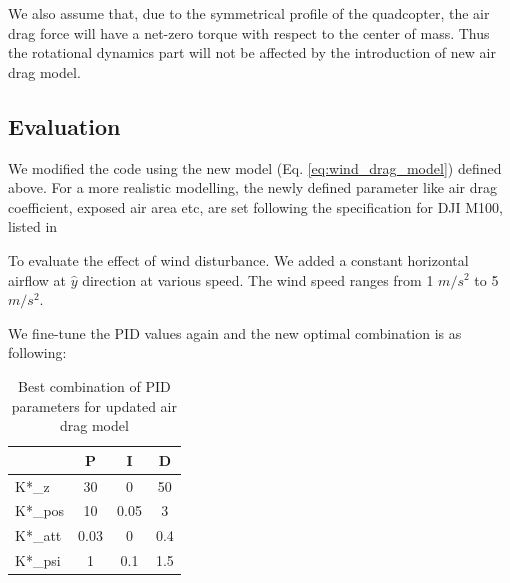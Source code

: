 \documentclass[12pt]{article}
\begin{document}
We also assume that, due to the symmetrical profile of the quadcopter, the air drag force will have a net-zero torque with respect to the center of mass.
Thus the rotational dynamics part will not be affected by the introduction of new air drag model.

\subsection{Evaluation}

We modified the code using the new model (Eq. \ref{eq:wind_drag_model}) defined above.
For a more realistic modelling, the newly defined parameter like air drag coefficient, exposed air area etc, are set following the specification for DJI M100, listed in \cite{liuswanto_modelling_2021}



To evaluate the effect of wind disturbance. We added a constant horizontal airflow at $\hat{y}$ direction at various speed.
The wind speed ranges from 1 $m/s^2$ to 5 $m/s^2$.

We fine-tune the PID values again and the new optimal combination is as following:

\begin{table}[H]
    \centering
    \begin{tabular}{|l|c|c|c|}
        \hline
                & P    & I    & D   \\
        \hline
        K*\_z   & 30   & 0    & 50  \\
        K*\_pos & 10   & 0.05 & 3   \\
        K*\_att & 0.03 & 0    & 0.4 \\
        K*\_psi & 1    & 0.1  & 1.5 \\
        \hline
    \end{tabular}
    \caption{Best combination of PID parameters for updated air drag model}
    \label{tab:pid_air}
\end{table}
\end{document}
